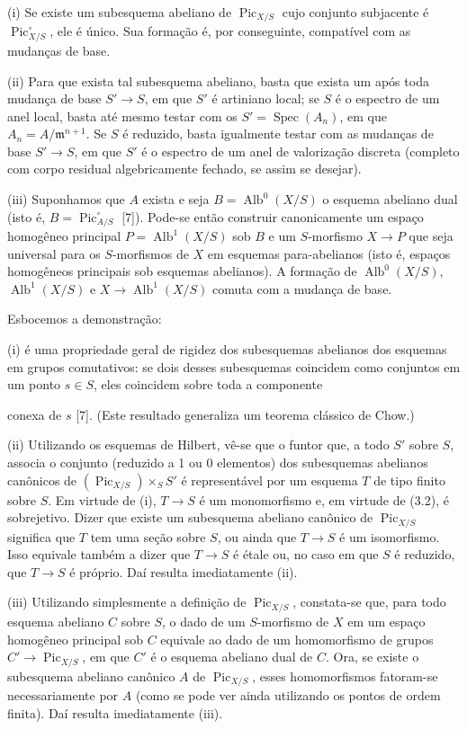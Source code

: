 \documentclass[11pt,twoside,openany]{book}
\numberwithin{equation}{section}
\newcommand{\src}[1]{%
  \phantomsection\hypertarget{src:#1}{}%
  \marginpar{\raggedleft\footnotesize\sffamily #1}%
}
\theoremstyle{plain}
\theoremstyle{definition}
\theoremstyle{remark}
\newcommand{\FgaUnitKey}{frontmatter}
\renewcommand{\src}[1]{%
  \phantomsection\hypertarget{src:\FgaUnitKey:#1}{}%
  \marginpar{\raggedleft\footnotesize\sffamily #1}%
}
\begin{document}
\noindent(i) Se existe um subesquema abeliano de
$\operatorname{Pic}_{X/S}$ cujo conjunto subjacente é
$\operatorname{Pic}_{X/S}^\circ$, ele é único. Sua formação é, por
conseguinte, compatível com as mudanças de base.

\noindent(ii) Para que exista tal subesquema abeliano, basta que exista um
após toda mudança de base $S'\longrightarrow S$, em que $S'$ é artiniano
local; se $S$ é o espectro de um anel local, basta até mesmo testar com os
$S'=\operatorname{Spec}(A_n)$, em que $A_n=A/\mathfrak m^{n+1}$. Se $S$ é
reduzido, basta igualmente testar com as mudanças de base
$S'\longrightarrow S$, em que $S'$ é o espectro de um anel de valorização
discreta (completo com corpo residual algebricamente fechado, se assim se
desejar).

\noindent(iii) Suponhamos que $A$ exista e seja
$B=\operatorname{Alb}^0(X/S)$ o esquema abeliano dual (isto é,
$B=\operatorname{Pic}_{A/S}^\circ$ [7]). Pode-se então construir
canonicamente um espaço homogêneo principal
$P=\operatorname{Alb}^1(X/S)$ sob $B$ e um $S$-morfismo
$X\longrightarrow P$ que seja universal para os $S$-morfismos de $X$ em
esquemas para-abelianos (isto é, espaços homogêneos principais sob esquemas
abelianos). A formação de $\operatorname{Alb}^0(X/S)$,
$\operatorname{Alb}^1(X/S)$ e
$X\longrightarrow\operatorname{Alb}^1(X/S)$ comuta com a mudança de base.

Esbocemos a demonstração:

(i) é uma propriedade geral de rigidez dos subesquemas abelianos dos esquemas
em grupos comutativos: se dois desses subesquemas coincidem como conjuntos em
um ponto $s\in S$, eles coincidem sobre toda a componente
\src{238}
conexa de $s$ [7]. (Este resultado generaliza um teorema clássico de Chow.)

(ii) Utilizando os esquemas de Hilbert, vê-se que o funtor que, a todo $S'$
sobre $S$, associa o conjunto (reduzido a 1 ou 0 elementos) dos subesquemas
abelianos canônicos de $(\operatorname{Pic}_{X/S})\times_S S'$ é
representável por um esquema $T$ de tipo finito sobre $S$. Em virtude de (i),
$T\longrightarrow S$ é um monomorfismo e, em virtude de (3.2), é
sobrejetivo. Dizer que existe um subesquema abeliano canônico de
$\operatorname{Pic}_{X/S}$ significa que $T$ tem uma seção sobre $S$, ou ainda
que $T\longrightarrow S$ é um isomorfismo. Isso equivale também a dizer que
$T\longrightarrow S$ é étale ou, no caso em que $S$ é reduzido, que
$T\longrightarrow S$ é próprio. Daí resulta imediatamente (ii).

(iii) Utilizando simplesmente a definição de $\operatorname{Pic}_{X/S}$,
constata-se que, para todo esquema abeliano $C$ sobre $S$, o dado de um
$S$-morfismo de $X$ em um espaço homogêneo principal sob $C$ equivale ao dado
de um homomorfismo de grupos
$C'\longrightarrow\operatorname{Pic}_{X/S}$, em que $C'$ é o esquema abeliano
dual de $C$. Ora, se existe o subesquema abeliano canônico $A$ de
$\operatorname{Pic}_{X/S}$, esses homomorfismos fatoram-se necessariamente por
$A$ (como se pode ver ainda utilizando os pontos de ordem finita). Daí resulta
imediatamente (iii).
\end{document}
